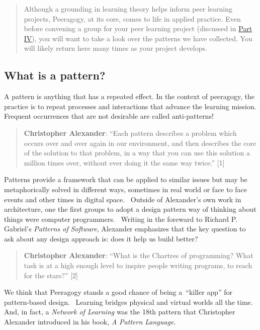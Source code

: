 \begin{quote}
Although a grounding in learning theory helps inform peer learning
projects, Peeragogy, at its core, comes to life in applied practice.
Even before convening a group for your peer learning project (discussed
in \href{http://peeragogy.github.io/convening.html}{Part IV}), you will
want to take a look over the patterns we have collected. You will likely
return here many times as your project develops.
\end{quote}

\hypertarget{what-is-a-pattern}{%
\subsection{What is a pattern?}\label{what-is-a-pattern}}

A pattern is anything that has a repeated effect. In the context of
peeragogy, the practice is to repeat processes and interactions that
advance the learning mission. Frequent occurrences that are not
desirable are called anti-patterns!

\begin{quote}
\textbf{Christopher Alexander}: ``Each pattern describes a problem which
occurs over and over again in our environment, and then describes the
core of the solution to that problem, in a way that you can use this
solution a million times over, without ever doing it the same way
twice.'' {{[}1{]}}
\end{quote}

Patterns provide a framework that can be applied to similar issues but
may be metaphorically solved in different ways, sometimes in real world
or face to face events and other times in digital space.~ Outside of
Alexander's own work in architecture, one the first groups to adopt a
design pattern way of thinking about things were computer programmers.~
Writing in the foreward to Richard P. Gabriel's \emph{Patterns of
Software}, Alexander emphasizes that the key question to ask about any
design approach is: does it help us build better?

\begin{quote}
\textbf{Christopher Alexander}: ``What is the Chartres of programming?
What task is at a high enough level to inspire people writing programs,
to reach for the stars?'' {{[}2{]}}
\end{quote}

We think that Peeragogy stands a good chance of being a~``killer app''
for pattern-based design.~ Learning bridges physical and virtual worlds
all the time.~ And, in fact, a \emph{Network of Learning} was the 18th
pattern that Christopher Alexander introduced in his book, \emph{A
Pattern Language}.


